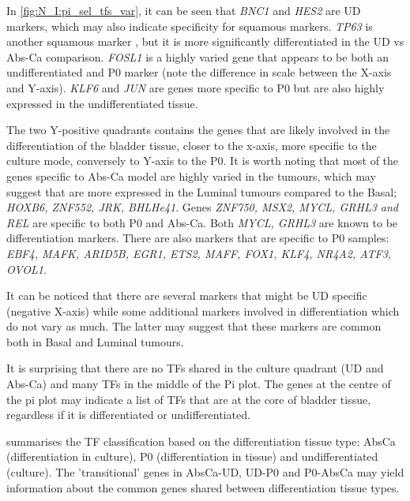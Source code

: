 In \cref{fig:N_I:pi_sel_tfs_var}, it can be seen that \textit{BNC1} and \textit{HES2} are UD markers, which may also indicate specificity for squamous markers. \textit{TP63} is another squamous marker \cite{Robertson2017-mg}, but it is more significantly differentiated in the UD vs Abs-Ca comparison. \textit{FOSL1} is a highly varied gene that appears to be both an undifferentiated and P0 marker (note the difference in scale between the X-axis and Y-axis). \textit{KLF6} and \textit{JUN} are genes more specific to P0 but are also highly expressed in the undifferentiated tissue.

The two Y-positive quadrants contains the genes that are likely involved in the differentiation of the bladder tissue, closer to the x-axis, more specific to the culture mode, conversely to Y-axis to the P0. It is worth noting that most of the genes specific to Abs-Ca model are highly varied in the tumours, which may suggest that are more expressed in the Luminal tumours compared to the Basal; \textit{HOXB6, ZNF552, JRK, BHLHe41}. Genes \textit{ZNF750, MSX2, MYCL, GRHL3 and REL} are specific to both P0 and Abs-Ca. Both \textit{MYCL, GRHL3} are known to be differentiation markers. There are also markers that are specific to P0 samples: \textit{EBF4, MAFK, ARID5B, EGR1, ETS2, MAFF, FOX1, KLF4, NR4A2, ATF3, OVOL1}. 

It can be noticed that there are several markers that might be UD specific (negative X-axis) while some additional markers involved in differentiation which do not vary as much. The latter may suggest that these markers are common both in Basal and Luminal tumours. 


It is surprising that there are no TFs shared in the culture quadrant (UD and Abs-Ca) and many TFs in the middle of the Pi plot. The genes at the centre of the pi plot may indicate a list of TFs that are at the core of bladder tissue, regardless if it is differentiated or undifferentiated.


 summarises the TF classification based on the differentiation tissue type: AbsCa (differentiation in culture), P0 (differentiation in tissue) and undifferentiated (culture). The 'transitional' genes in AbsCa-UD, UD-P0 and P0-AbsCa may yield information about the common genes shared between differentiation tissue types.

